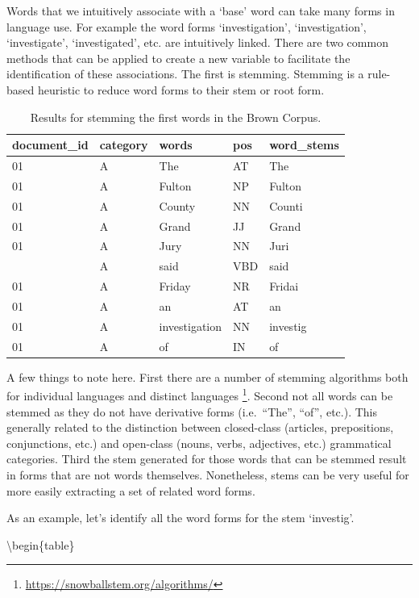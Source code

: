 \documentclass[
]{article}
\begin{document}
Words that we intuitively associate with a `base' word can take many forms in language use. For example the word forms `investigation', `investigation', `investigate', `investigated', etc. are intuitively linked. There are two common methods that can be applied to create a new variable to facilitate the identification of these associations. The first is stemming. Stemming is a rule-based heuristic to reduce word forms to their stem or root form.

\begin{table}

\caption{\label{tab:recoding-stemming-brown-example}Results for stemming the first words in the Brown Corpus.}
\centering
\begin{tabular}[t]{lllll}
\toprule
document\_id & category & words & pos & word\_stems\\
\midrule
01 & A & The & AT & The\\
01 & A & Fulton & NP & Fulton\\
01 & A & County & NN & Counti\\
01 & A & Grand & JJ & Grand\\
01 & A & Jury & NN & Juri\\
\addlinespace
01 & A & said & VBD & said\\
01 & A & Friday & NR & Fridai\\
01 & A & an & AT & an\\
01 & A & investigation & NN & investig\\
01 & A & of & IN & of\\
\bottomrule
\end{tabular}
\end{table}

A few things to note here. First there are a number of stemming algorithms both for individual languages and distinct languages \footnote{\url{https://snowballstem.org/algorithms/}}. Second not all words can be stemmed as they do not have derivative forms (i.e.~``The'', ``of'', etc.). This generally related to the distinction between closed-class (articles, prepositions, conjunctions, etc.) and open-class (nouns, verbs, adjectives, etc.) grammatical categories. Third the stem generated for those words that can be stemmed result in forms that are not words themselves. Nonetheless, stems can be very useful for more easily extracting a set of related word forms.

As an example, let's identify all the word forms for the stem `investig'.

\textbackslash begin\{table\}
\end{document}
